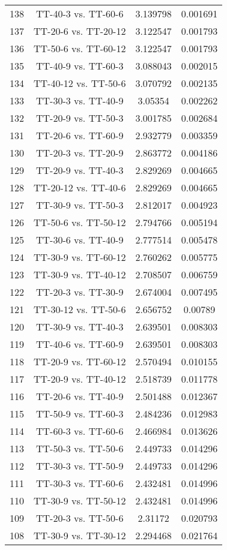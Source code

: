 \documentclass[a4paper,10pt]{article}
\begin{document}
\begin{landscape}
\begin{table}[!htp]
\begin{tabular}{cccc}
138&TT-40-3 vs. TT-60-6&3.139798&0.001691\\
137&TT-20-6 vs. TT-20-12&3.122547&0.001793\\
136&TT-50-6 vs. TT-60-12&3.122547&0.001793\\
135&TT-40-9 vs. TT-60-3&3.088043&0.002015\\
134&TT-40-12 vs. TT-50-6&3.070792&0.002135\\
133&TT-30-3 vs. TT-40-9&3.05354&0.002262\\
132&TT-20-9 vs. TT-50-3&3.001785&0.002684\\
131&TT-20-6 vs. TT-60-9&2.932779&0.003359\\
130&TT-20-3 vs. TT-20-9&2.863772&0.004186\\
129&TT-20-9 vs. TT-40-3&2.829269&0.004665\\
128&TT-20-12 vs. TT-40-6&2.829269&0.004665\\
127&TT-30-9 vs. TT-50-3&2.812017&0.004923\\
126&TT-50-6 vs. TT-50-12&2.794766&0.005194\\
125&TT-30-6 vs. TT-40-9&2.777514&0.005478\\
124&TT-30-9 vs. TT-60-12&2.760262&0.005775\\
123&TT-30-9 vs. TT-40-12&2.708507&0.006759\\
122&TT-20-3 vs. TT-30-9&2.674004&0.007495\\
121&TT-30-12 vs. TT-50-6&2.656752&0.00789\\
120&TT-30-9 vs. TT-40-3&2.639501&0.008303\\
119&TT-40-6 vs. TT-60-9&2.639501&0.008303\\
118&TT-20-9 vs. TT-60-12&2.570494&0.010155\\
117&TT-20-9 vs. TT-40-12&2.518739&0.011778\\
116&TT-20-6 vs. TT-40-9&2.501488&0.012367\\
115&TT-50-9 vs. TT-60-3&2.484236&0.012983\\
114&TT-60-3 vs. TT-60-6&2.466984&0.013626\\
113&TT-50-3 vs. TT-50-6&2.449733&0.014296\\
112&TT-30-3 vs. TT-50-9&2.449733&0.014296\\
111&TT-30-3 vs. TT-60-6&2.432481&0.014996\\
110&TT-30-9 vs. TT-50-12&2.432481&0.014996\\
109&TT-20-3 vs. TT-50-6&2.31172&0.020793\\
108&TT-30-9 vs. TT-30-12&2.294468&0.021764\\

\end{tabular}
\end{table}
\end{landscape}
\end{document}
